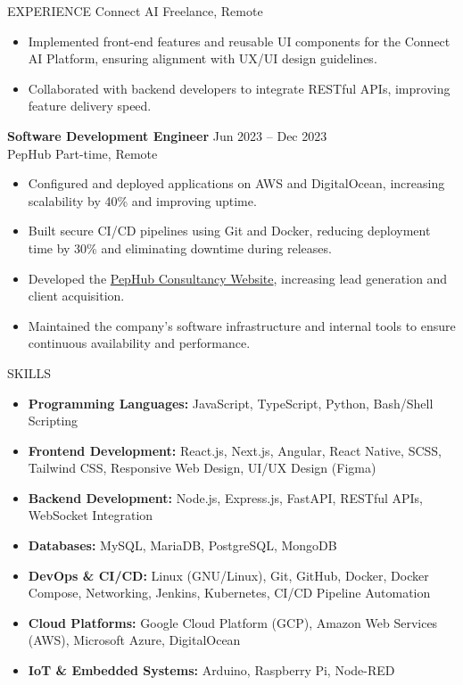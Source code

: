 \documentclass{resume}
\begin{document}
\begin{rSection}{EXPERIENCE}
	Connect AI \hfill {Freelance, Remote}
	\vspace{-0.4em}
	\begin{itemize}
		\item{Implemented front-end features and reusable UI components for the Connect AI Platform, ensuring alignment with UX/UI design guidelines.}
		\item{Collaborated with backend developers to integrate RESTful APIs, improving feature delivery speed.}
	\end{itemize}
	{\bf Software Development Engineer} \hfill {Jun 2023 -- Dec 2023}\\
	PepHub \hfill {Part-time, Remote}
	\vspace{-0.4em}
	\begin{itemize}
		\item{Configured and deployed applications on AWS and DigitalOcean, increasing scalability by 40\% and improving uptime.}
		\item{Built secure CI/CD pipelines using Git and Docker, reducing deployment time by 30\% and eliminating downtime during releases.}
		\item{Developed the \href{https://consultancy.pephub.tech}{PepHub Consultancy Website}, increasing lead generation and client acquisition.}
		\item{Maintained the company’s software infrastructure and internal tools to ensure continuous availability and performance.}
	\end{itemize}
\end{rSection}
\vspace{-0.4em}
\begin{rSection}{SKILLS}
	\begin{itemize}
		\item \textbf{Programming Languages:} JavaScript, TypeScript, Python, Bash/Shell Scripting
		\item \textbf{Frontend Development:} React.js, Next.js, Angular, React Native, SCSS, Tailwind CSS, Responsive Web Design, UI/UX Design (Figma)
		\item \textbf{Backend Development:} Node.js, Express.js, FastAPI, RESTful APIs, WebSocket Integration
		\item \textbf{Databases:} MySQL, MariaDB, PostgreSQL, MongoDB
		\item \textbf{DevOps \& CI/CD:} Linux (GNU/Linux), Git, GitHub, Docker, Docker Compose, Networking, Jenkins, Kubernetes, CI/CD Pipeline Automation
		\item \textbf{Cloud Platforms:} Google Cloud Platform (GCP), Amazon Web Services (AWS), Microsoft Azure, DigitalOcean
		\item \textbf{IoT \& Embedded Systems:} Arduino, Raspberry Pi, Node-RED
	\end{itemize}
\end{rSection}
\end{document}

